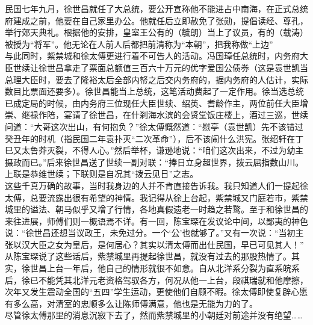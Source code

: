 民国七年九月，徐世昌就任了大总统，要公开宣称他不能进占中南海，在正式总统府建成之前，他要在自己家里办公。他就任后立即赦免了张勋，提倡读经、尊孔，举行郊天典礼。根据他的安排，皇室王公有的（毓朗）当上了议员，有的（载涛）被授为“将军”。他无论在人前人后都把前清称为“本朝”，把我称做“上边”\\

与此同时，紫禁城和徐太傅更进行着不可告人的活动。冯国璋任总统时，内务府大臣世续让徐世昌拿走了票面总额值三百六十万元的优字爱国公债券（这是袁世凯当总理大臣时，要去了隆裕太后全部内帑之后交内务府的，据内务府的人估计，实际数目比票面还要多）。徐世昌能当上总统，这笔活动费起了一定作用。徐当选总统已成定局的时候，由内务府三位现任大臣世续、绍英、耆龄作主，两位前任大臣增崇、继禄作陪，宴请了徐世昌，在什刹海水滨的会贤堂饭庄楼上，酒过三巡，世续问道：“大哥这次出山，有何抱负？”徐太傅慨然道：“慰亭（袁世凯）先不该错过癸丑年的时机（指民国二年袁扑灭“二次革命”），后不该闹什么洪宪。张绍轩在丁巳又太鲁莽灭裂，不得人心。”然后举杯，谦逊地说：“咱们这次出来，不过为幼主摄政而已。”后来徐世昌送了世续一副对联：“捧日立身超世界，拨云屈指数山川。上联是恭维世续；下联则是自况其“拨云见日”之志。\\

这些千真万确的故事，当时我身边的人并不肯直接告诉我。我只知道人们一提起徐太傅，总要流露出很有希望的神情。我记得从徐上台起，紫禁城又门庭若市，紫禁城里的谥法、朝马似乎又增了行情，各地真假遗老一时趋之若鹜。至于和徐世昌的来往进展，师傅们则一概语焉不详。有一回，陈宝琛在发议论中间，以鄙夷的神色说：“徐世昌还想当议政王，未免过分。一个‘公’也就够了。”又有一次说：“当初主张以汉大臣之女为皇后，是何居心？其实以清太傅而出仕民国，早已可见其人！”\\

从陈宝琛说了这些话后，紫禁城里再提起徐世昌，就没有过去的那股热情了。其实，徐世昌上台一年后，他自己的情形就很不如意。自从北洋系分裂为直系皖系后，徐已不能凭其北洋元老资格驾驭各方，何况从他一上台，段祺瑞就和他摩擦，次年又发生震动全国的“五四”学生运动，更使他们自顾不暇。徐太傅即使复辟心愿有多么高，对清室的忠顺多么让陈师傅满意，他也是无能为力的了。\\

尽管徐太傅那里的消息沉寂下去了，然而紫禁城里的小朝廷对前途并没有绝望……\\